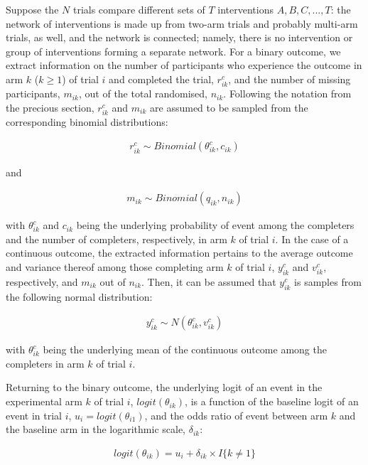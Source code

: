 Suppose the \(N\) trials compare different sets of \(T\) interventions \({A, B, C,..., T}\):
the network of interventions is made up from two-arm trials and probably
multi-arm trials, as well, and the network is connected; namely, there is no
intervention or group of interventions forming a separate network. For a binary
outcome, we extract information on the number of participants who experience the
outcome in arm \(k\) (\(k \ge 1\)) of trial \(i\) and completed the trial, \(r^{c}_{ik}\),
and the number of missing participants, \(m_{ik}\), out of the total randomised,
\(n_{ik}\). Following the notation from the precious section, \(r^{c}_{ik}\) and \(m_{ik}\)
are assumed to be sampled from the corresponding binomial distributions:

\[\begin{aligned}
r^{c}_{ik} \sim Binomial(\theta^{c}_{ik}, c_{ik})  
\end{aligned}\]

and

\[\begin{aligned}
m_{ik} \sim Binomial(q_{ik}, n_{ik})  
\end{aligned}\]

with \(\theta^{c}_{ik}\) and \(c_{ik}\) being the underlying probability of event
among the completers and the number of completers, respectively, in arm \(k\) of
trial \(i\). In the case of a continuous outcome, the extracted information pertains
to the average outcome and variance thereof among those completing arm \(k\) of trial
\(i\), \(y^{c}_{ik}\) and \(v^{c}_{ik}\), respectively, and \(m_{ik}\) out of \(n_{ik}\).
Then, it can be assumed that \(y^{c}_{ik}\) is samples from the following normal
distribution:

\[\begin{aligned}
y^{c}_{ik} \sim N(\theta^{c}_{ik}, v^{c}_{ik})  
\end{aligned}\]

with \(\theta^{c}_{ik}\) being the underlying mean of the continuous outcome among
the completers in arm \(k\) of trial \(i\).

Returning to the binary outcome, the underlying logit of an event in the experimental
arm \(k\) of trial \(i\), \(logit(\theta_{ik})\), is a function of the baseline logit of
an event in trial \(i\), \(u_{i} = logit(\theta_{i1})\),
and the odds ratio of event between arm \(k\) and the baseline arm in the logarithmic
scale, \(\delta_{ik}\):

\[\begin{aligned}
logit(\theta_{ik}) = u_{i} + \delta_{ik} \times I\{k \ne 1\}   
\end{aligned}\]

